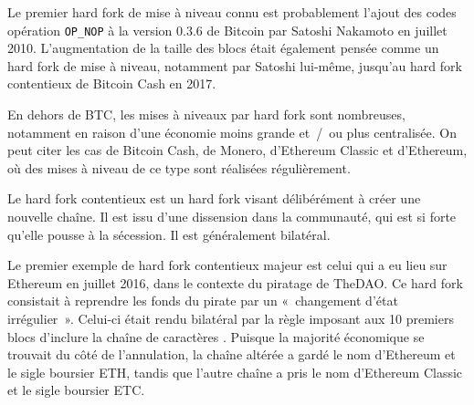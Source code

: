 Le premier hard fork de mise à niveau connu est probablement l'ajout des codes opération \texttt{OP\_NOP} à la version 0.3.6 de Bitcoin par Satoshi Nakamoto en juillet 2010. L'augmentation de la taille des blocs était également pensée comme un hard fork de mise à niveau, notamment par Satoshi lui-même, jusqu'au hard fork contentieux de Bitcoin Cash en 2017.

En dehors de BTC, les mises à niveaux par hard fork sont nombreuses, notamment en raison d'une économie moins grande et~/~ou plus centralisée. On peut citer les cas de Bitcoin Cash, de Monero, d'Ethereum Classic et d'Ethereum, où des mises à niveau de ce type sont réalisées régulièrement.

Le hard fork contentieux est un hard fork visant délibérément à créer une nouvelle chaîne. Il est issu d'une dissension dans la communauté, qui est si forte qu'elle pousse à la sécession. Il est généralement bilatéral.

Le premier exemple de hard fork contentieux majeur est celui qui a eu lieu sur Ethereum en juillet 2016, dans le contexte du piratage de TheDAO. Ce hard fork consistait à reprendre les fonds du pirate par un «~changement d'état irrégulier~». Celui-ci était rendu bilatéral par la règle imposant aux 10 premiers blocs d'inclure la chaîne de caractères . Puisque la majorité économique se trouvait du côté de l'annulation, la chaîne altérée a gardé le nom d'Ethereum et le sigle boursier ETH, tandis que l'autre chaîne a pris le nom d'Ethereum Classic et le sigle boursier ETC.

